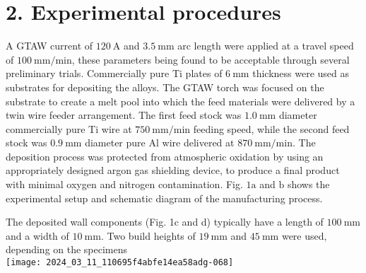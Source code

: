 \documentclass[10pt]{article}
\begin{document}
\section*{2. Experimental procedures}
A GTAW current of $120 \mathrm{~A}$ and $3.5 \mathrm{~mm}$ arc length were applied at a travel speed of $100 \mathrm{~mm} / \mathrm{min}$, these parameters being found to be acceptable through several preliminary trials. Commercially pure Ti plates of $6 \mathrm{~mm}$ thickness were used as substrates for depositing the alloys. The GTAW torch was focused on the substrate to create a melt pool into which the feed materials were delivered by a twin wire feeder arrangement. The first feed stock was $1.0 \mathrm{~mm}$ diameter commercially pure Ti wire at $750 \mathrm{~mm} / \mathrm{min}$ feeding speed, while the second feed stock was $0.9 \mathrm{~mm}$ diameter pure $\mathrm{Al}$ wire delivered at $870 \mathrm{~mm} / \mathrm{min}$. The deposition process was protected from atmospheric oxidation by using an appropriately designed argon gas shielding device, to produce a final product with minimal oxygen and nitrogen contamination. Fig. $1 \mathrm{a}$ and $\mathrm{b}$ shows the experimental setup and schematic diagram of the manufacturing process.

The deposited wall components (Fig. 1c and d) typically have a length of $100 \mathrm{~mm}$ and a width of $10 \mathrm{~mm}$. Two build heights of $19 \mathrm{~mm}$ and $45 \mathrm{~mm}$ were used, depending on the specimens\\
\texttt{[image: 2024\_03\_11\_110695f4abfe14ea58adg-068]}
\end{document}
